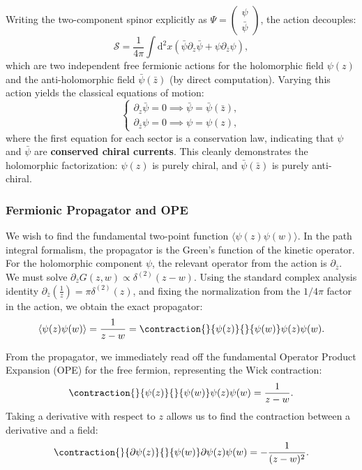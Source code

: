 Writing the two-component spinor explicitly as \(\Psi = \begin{pmatrix} \psi \\ \bar{\psi} \end{pmatrix}\), the action decouples:
\[
    \mathcal{S} = \frac{1}{4\pi} \int \mathrm{d}^2x (\bar{\psi} \partial_z \bar{\psi} + \psi \partial_{\bar{z}} \psi),
\]
which are two independent free fermionic actions for the holomorphic field \(\psi(z)\) and the anti-holomorphic field \(\bar{\psi}(\bar{z})\) (by direct computation).
Varying this action yields the classical equations of motion:
\[
    \begin{cases}
        \partial_z \bar{\psi} = 0 \implies \bar{\psi} = \bar{\psi}(\bar{z}), \\
        \partial_{\bar{z}} \psi = 0 \implies \psi = \psi(z),
    \end{cases}
\]
where the first equation for each sector is a conservation law, indicating that \(\psi\) and \(\bar{\psi}\) are \textbf{conserved chiral currents}. This cleanly demonstrates the holomorphic factorization: \(\psi(z)\) is purely chiral, and \(\bar{\psi}(\bar{z})\) is purely anti-chiral.

\subsubsection{Fermionic Propagator and OPE}

We wish to find the fundamental two-point function \(\langle \psi(z)\psi(w) \rangle\). In the path integral formalism, the propagator is the Green's function of the kinetic operator. For the holomorphic component \(\psi\), the relevant operator from the action is \(\partial_{\bar{z}}\). We must solve \(\partial_{\bar{z}} G(z, w) \propto \delta^{(2)}(z-w)\). Using the standard complex analysis identity \(\partial_{\bar{z}} \left(\frac{1}{z}\right) = \pi \delta^{(2)}(z)\), and fixing the normalization from the \(1/4\pi\) factor in the action, we obtain the exact propagator:
\[
    \langle \psi(z)\psi(w) \rangle = \frac{1}{z-w} = \contraction{}{\psi(z)}{}{\psi(w)} \psi(z)\psi(w).
\]

From the propagator, we immediately read off the fundamental Operator Product Expansion (OPE) for the free fermion, representing the Wick contraction:
\[
    \contraction{}{\psi(z)}{}{\psi(w)} \psi(z)\psi(w) = \frac{1}{z-w}.
\]
Taking a derivative with respect to \(z\) allows us to find the contraction between a derivative and a field:
\[
    \contraction{}{\partial\psi(z)}{}{\psi(w)} \partial\psi(z)\psi(w) = -\frac{1}{(z-w)^2}.
\]

